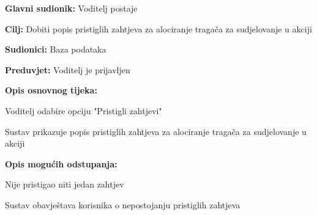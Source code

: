 					\noindent {}
					\begin{packed_item}
						
						\item \textbf{Glavni sudionik:} Voditelj postaje
						\item \textbf{Cilj:} Dobiti popis pristiglih zahtjeva za alociranje tragača za sudjelovanje u akciji
						\item \textbf{Sudionici:} Baza podataka
						\item \textbf{Preduvjet:} Voditelj je prijavljen
						\item \textbf{Opis osnovnog tijeka:}
						
						\item[] \begin{packed_enum}
							
							\item Voditelj odabire opciju "Pristigli zahtjevi"
							\item Sustav prikazuje popis pristiglih zahtjeva za alociranje tragača za sudjelovanje u akciji
						\end{packed_enum}
						
						\item  \textbf{Opis mogućih odstupanja:}
						
						\item[] \begin{packed_item}
							
							\item[2.a] Nije pristigao niti jedan zahtjev
							\item[] \begin{packed_enum}
								
								\item Sustav obavještava korisnika o nepostojanju pristiglih zahtjeva
								
							\end{packed_enum}
						\end{packed_item}
					\end{packed_item}
					
